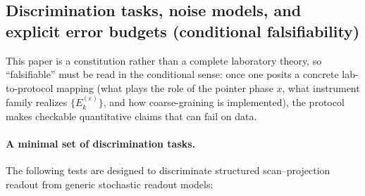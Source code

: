 \subsection{Discrimination tasks, noise models, and explicit error budgets (conditional falsifiability)}
\label{sec:discrimination_tasks}

This paper is a constitution rather than a complete laboratory theory, so ``falsifiable'' must be read in the conditional sense: once one posits a concrete lab-to-protocol mapping (what plays the role of the pointer phase $x$, what instrument family realizes $\{E_k^{(\varepsilon)}\}$, and how coarse-graining is implemented), the protocol makes checkable quantitative claims that can fail on data.

\paragraph{A minimal set of discrimination tasks.}
The following tests are designed to discriminate structured scan--projection readout from generic stochastic readout models:
